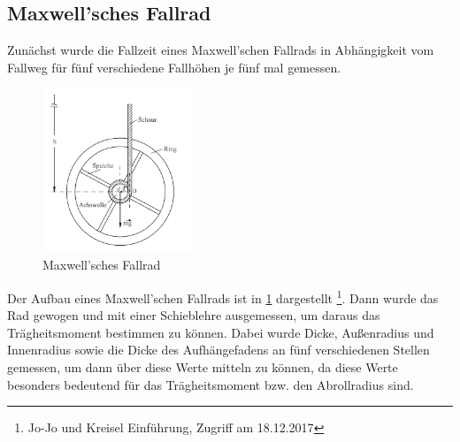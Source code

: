 \documentclass[
	a4paper,
	12pt,
	pagesize,
	ngerman
]{scrartcl}
\begin{document}
	\subsection{Maxwell'sches Fallrad}
	Zunächst wurde die Fallzeit eines Maxwell'schen Fallrads in Abhängigkeit vom Fallweg für fünf verschiedene Fallhöhen je fünf mal gemessen.
	\begin{figure}[tb]
		\includegraphics[width=0.4\textwidth]{Fallrad}
		\centering
		\caption{Maxwell'sches Fallrad}
		\label{Fallrad}
		\centering
	\end{figure}
	Der Aufbau eines Maxwell'schen Fallrads ist in \cref{Fallrad} dargestellt \footnote{Jo-Jo und Kreisel Einführung, Zugriff am 18.12.2017}.
	Dann wurde das Rad gewogen und mit einer Schieblehre ausgemessen, um daraus das Trägheitsmoment bestimmen zu können.
	Dabei wurde Dicke, Außenradius und Innenradius sowie die Dicke des Aufhängefadens an fünf verschiedenen Stellen gemessen, um dann über diese Werte mitteln zu können, da diese Werte besonders bedeutend für das Trägheitsmoment bzw. den Abrollradius sind.
	
\end{document}
